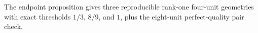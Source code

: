 The endpoint proposition gives three reproducible rank-one four-unit geometries with exact thresholds \(1/3\), \(8/9\), and \(1\), plus the eight-unit perfect-quality pair check.